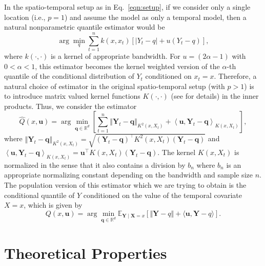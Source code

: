 \documentclass[11pt]{article}
\def\E{\mathbb{E}}
\def\R{\mathbb{R}}
\newcommand{\bb}[1]{\boldsymbol{#1}}
\newcommand{\tr}{^{\intercal}}
\theoremstyle{general}
\numberwithin{equation}{section}
\begin{document}
In the spatio-temporal setup as in Eq.~\eqref{eqn:setup}, if we consider only a single location (i.e., $p = 1$) and assume the model as only a temporal model, then a natural nonparametric quantile estimator would be 
\begin{equation}
    \arg\min_{q} \sum_{t=1}^n k(x, x_t) \left[ \vert Y_t - q\vert + u(Y_t - q) \right],
\end{equation}
\noindent where $k(\cdot, \cdot)$ is a kernel of appropriate bandwidth. For $u = (2\alpha - 1)$ with $0 < \alpha < 1$, this estimator becomes the kernel weighted version of the $\alpha$-th quantile of the conditional distribution of $Y_t$ conditioned on $x_t = x$. Therefore, a natural choice of estimator in the original spatio-temporal setup (with $p > 1$) is to introduce matrix valued kernel functions $K(\cdot, \cdot)$ (see \cite{alvarez2011kernels} for details) in the inner products. Thus, we consider the estimator 
\begin{equation}
    \widehat{Q}(x, \bb{u}) = \arg\min_{\bb{q}\in \R^d} \left[ \sum_{t=1}^n  \left\Vert \bb{Y}_t - \bb{q}\right\Vert_{K^2(x,X_t)} + \left\langle\bb{u}, \bb{Y}_t - \bb{q} \right\rangle_{K(x,X_t)} \right],    \label{eqn:estimator}
\end{equation}
\noindent where $\left\Vert \bb{Y}_t - \bb{q}\right\Vert_{K^2(x,X_t)} = \sqrt{(\bb{Y}_t - \bb{q})\tr K^2(x, X_t)(\bb{Y}_t - \bb{q}) }$ and $\left\langle\bb{u}, \bb{Y}_t - \bb{q} \right\rangle_{K(x,X_t)} = \bb{u}\tr K(x, X_t) (\bb{Y}_t - \bb{q})$. The kernel $K(x, X_t)$ is normalized in the sense that it also contains a division by $b_n$ where $b_n$ is an appropriate normalizing constant depending on the bandwidth and sample size $n$. The population version of this estimator which we are trying to obtain is the conditional quantile of $Y$ conditioned on the value of the temporal covariate $X = x$, which is given by
\begin{equation}
    Q(x, \bb{u}) = \arg\min_{\bb{q}\in \R^d} \E_{\bb{Y} \mid \bb{X} = x}\left[ \Vert \bb{Y} - q\Vert +  \langle \bb{u}, \bb{Y} - q \rangle \right].
    \label{eqn:parameter}
\end{equation}

\section{Theoretical Properties}
\end{document}
